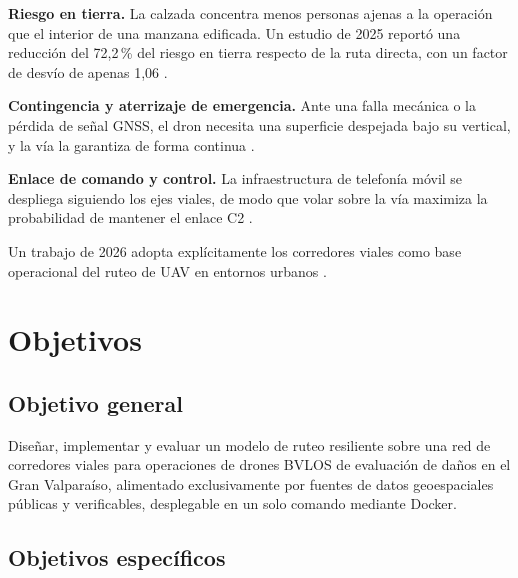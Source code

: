 \documentclass[conference]{IEEEtran}
\begin{document}
\textbf{Riesgo en tierra.} La calzada concentra menos personas ajenas a la operación que el interior de una manzana edificada. Un estudio de 2025 reportó una reducción del 72,2\,\% del riesgo en tierra respecto de la ruta directa, con un factor de desvío de apenas 1,06 \cite{brassel2025}.

\textbf{Contingencia y aterrizaje de emergencia.} Ante una falla mecánica o la pérdida de señal GNSS, el dron necesita una superficie despejada bajo su vertical, y la vía la garantiza de forma continua \cite{almozel2025}.

\textbf{Enlace de comando y control.} La infraestructura de telefonía móvil se despliega siguiendo los ejes viales, de modo que volar sobre la vía maximiza la probabilidad de mantener el enlace C2 \cite{sinha2024}.

Un trabajo de 2026 adopta explícitamente los corredores viales como base operacional del ruteo de UAV en entornos urbanos \cite{yang2026}.

\section{Objetivos}

\subsection{Objetivo general}

Diseñar, implementar y evaluar un modelo de ruteo resiliente sobre una red de corredores viales para operaciones de drones BVLOS de evaluación de daños en el Gran Valparaíso, alimentado exclusivamente por fuentes de datos geoespaciales públicas y verificables, desplegable en un solo comando mediante Docker.

\subsection{Objetivos específicos}
\end{document}
